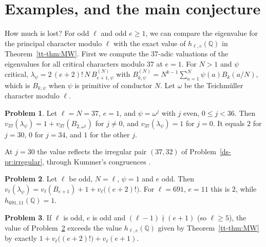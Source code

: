 \documentclass[reqno]{amsart}
\theoremstyle{definition}
\newtheorem{problem}{Problem}[section]
\theoremstyle{plain}
\newcommand{\Q}{\mathbb{Q}}
\begin{document}
\section{Examples, and the main conjecture}\label{sec:examples}

How much is lost?  For odd \(\ell\) and odd \(e\ge1\), we can compare the eigenvalue for the principal character modulo \(\ell\) with the exact value of \(h_{\ell,e}(\Q)\) in Theorem~\ref{tt-thm:MW}.  First we compute the \(37\)-adic valuations of the eigenvalues for all critical characters modulo \(37\) at \(e=1\).  For \(N>1\) and \(\psi\) critical, \(\lambda_\psi=2\,(e+2)!\,N\,B^{(N)}_{e+1,\psi}\) with \(B^{(N)}_{k,\psi}=N^{k-1}\sum_{a=1}^N\psi(a)B_k(a/N)\), which is \(B_{k,\psi}\) when \(\psi\) is primitive of conductor \(N\).  Let \(\omega\) be the Teichm\"uller character modulo \(\ell\).

\begin{problem}\label{pr:37}
Let \(\ell=N=37\), \(e=1\), and \(\psi=\omega^j\) with \(j\) even, \(0\le j<36\).  Then \(v_{37}(\lambda_\psi)=1+v_{37}(B_{2,\omega^j})\) for \(j\ne0\), and \(v_{37}(\lambda_\psi)=1\) for \(j=0\).  It equals \(2\) for \(j=30\), \(0\) for \(j=34\), and \(1\) for the other \(j\).
\end{problem}

At \(j=30\) the value reflects the irregular pair \((37,32)\) of Problem~\ref{ds-pr:irregular}, through Kummer's congruences \cite[Ch.~5]{Wa}.

\begin{problem}\label{pr:psi-one}
Let \(\ell\) be odd, \(N=\ell\), \(\psi=1\) and \(e\) odd.  Then \(v_\ell(\lambda_\psi)=v_\ell(B_{e+1})+1+v_\ell\bigl((e+2)!\bigr)\).  For \(\ell=691\), \(e=11\) this is \(2\), while \(h_{691,11}(\Q)=1\).
\end{problem}

\begin{problem}\label{pr:compare}
If \(\ell\) is odd, \(e\) is odd and \((\ell-1)\nmid(e+1)\) (so \(\ell\ge5\)), the value of Problem~\ref{pr:psi-one} exceeds the value \(h_{\ell,e}(\Q)\) given by Theorem~\ref{tt-thm:MW} by exactly \(1+v_\ell\bigl((e+2)!\bigr)+v_\ell(e+1)\).
\end{problem}
\end{document}
